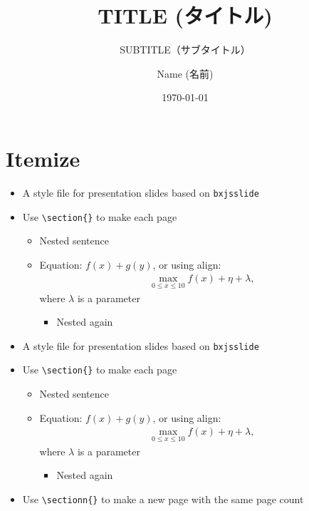 \documentclass[xelatex,ja=standard,jafont=sourcehan,fleqn,no-math,21pt,paper={142.875truemm}{254truemm},english]{bxjsslidemd}
\title{TITLE (タイトル)}
\subtitle{SUBTITLE（サブタイトル）}
\author{Name (名前)}
\date{\today}
\begin{document}
\maketitle

\section{Itemize}
\begin{itemize}
 \item A style file for presentation slides based on \texttt{bxjsslide}
 \item Use \verb|\section{}| to make each page
       \begin{itemize}
	\item Nested sentence
	\item Equation: $f(x) + g(y)$, or using align:
	      \begin{align*}
	       \max_{0 \le x \le 10} f(x) + \eta + \lambda,
	      \end{align*}
	      where $\lambda$ is a parameter
	      \begin{itemize}
	       \item Nested again
	      \end{itemize}
       \end{itemize}
 \end{itemize}

\begin{itemize}
 \item A style file for presentation slides based on \texttt{bxjsslide}
 \item Use \verb|\section{}| to make each page
       \begin{itemize}
	\item Nested sentence
	\item Equation: $f(x) + g(y)$, or using align:
	      \begin{align*}
	       \max_{0 \le x \le 10} f(x) + \eta + \lambda,
	      \end{align*}
	      where $\lambda$ is a parameter
	      \begin{itemize}
	       \item Nested again
	      \end{itemize}
       \end{itemize}
 \item Use \verb|\sectionn{}| to make a new page with the same page count
\end{itemize}
\end{document}
